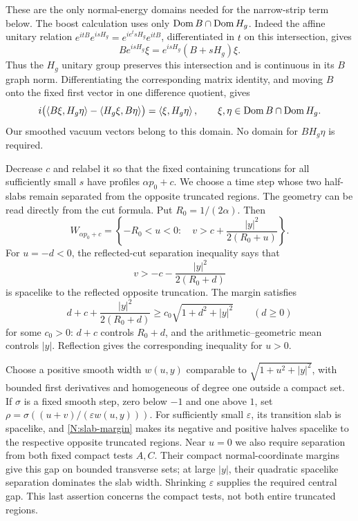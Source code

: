 These are the only normal-energy domains needed for the narrow-strip
term below.  The boost calculation uses only
$\operatorname{Dom} B\cap\operatorname{Dom} H_g$. Indeed the affine unitary relation
$e^{itB}e^{isH_g}=e^{ie^t sH_g}e^{itB}$, differentiated in $t$ on
this intersection, gives
\[
 B e^{isH_g}\xi=e^{isH_g}(B+sH_g)\xi.
\]
Thus the $H_g$ unitary group preserves this intersection and is continuous
in its $B$ graph norm. Differentiating the corresponding matrix identity,
and moving $B$ onto the fixed first vector in one difference quotient,
gives
\begin{equation}\label{N:affine-form}
 i\bigl(\left\langle B\xi,H_g\eta\right\rangle-\left\langle H_g\xi,B\eta\right\rangle\bigr)
   =\left\langle\xi,H_g\eta\right\rangle,
 \qquad \xi,\eta\in\operatorname{Dom} B\cap\operatorname{Dom} H_g.
\end{equation}
Our smoothed vacuum vectors belong to this domain. No domain for
$BH_g\eta$ is required.

Decrease $c$ and relabel it so that the fixed containing truncations
for all sufficiently small $s$ have profiles $\alpha p_0+c$.
We choose a time step whose two half-slabs remain separated from the
opposite truncated regions. The geometry can be read directly from the
cut formula. Put $R_0=1/(2\alpha)$. Then
\[
 W_{\alpha p_0+c}
 =\left\{-R_0<u<0:\quad
       v>c+\frac{|y|^2}{2(R_0+u)}\right\}.
\]
For $u=-d<0$, the reflected-cut separation inequality says that
\[
 v>-c-\frac{|y|^2}{2(R_0+d)}
\]
is spacelike to the reflected opposite truncation. The margin satisfies
\begin{equation}\label{N:slab-margin}
 d+c+\frac{|y|^2}{2(R_0+d)}
 \ge c_0\sqrt{1+d^2+|y|^2}\qquad(d\ge0)
\end{equation}
for some $c_0>0$: $d+c$ controls $R_0+d$, and the
arithmetic--geometric mean controls $|y|$. Reflection gives the
corresponding inequality for $u>0$.

Choose a positive smooth width $w(u,y)$ comparable to
$\sqrt{1+u^2+|y|^2}$, with bounded first derivatives and homogeneous of
degree one outside a compact set. If $\sigma$ is a fixed smooth step,
zero below $-1$ and one above $1$, set
$\rho=\sigma((u+v)/(\varepsilon w(u,y)))$.
For sufficiently small $\varepsilon$, its transition slab is spacelike,
and \eqref{N:slab-margin} makes its negative and positive halves
spacelike to the respective opposite truncated regions. Near $u=0$ we
also require separation from both fixed compact tests $A,C$.
Their compact normal-coordinate margins give this gap on bounded
transverse sets; at large $|y|$, their quadratic spacelike separation
dominates the slab width. Shrinking $\varepsilon$ supplies the required
central gap. This last assertion concerns the compact tests, not both
entire truncated regions.

